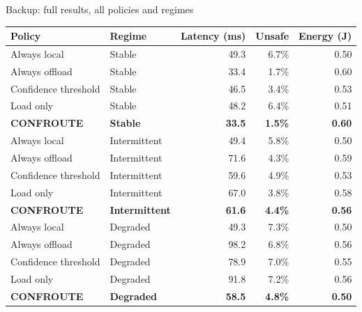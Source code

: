 \documentclass[aspectratio=169, 11pt]{beamer}
\newcommand{\hl}[1]{{\color{cblue}\bfseries #1}}
\begin{document}
\begin{frame}{Backup: full results, all policies and regimes}

\vspace{0.4em}
\centering
{\footnotesize
\begin{tabular}{@{}llrrr@{}}
\toprule
\textbf{\color{navy}Policy} & \textbf{\color{navy}Regime} & \textbf{\color{navy}Latency (ms)} & \textbf{\color{navy}Unsafe} & \textbf{\color{navy}Energy (J)} \\
\midrule
Always local        & Stable       & 49.3 & 6.7\% & 0.50 \\
Always offload      & Stable       & 33.4 & 1.7\% & 0.60 \\
Confidence threshold& Stable       & 46.5 & 3.4\% & 0.53 \\
Load only           & Stable       & 48.2 & 6.4\% & 0.51 \\
\hl{CONFROUTE} & \hl{Stable} & \hl{33.5} & \hl{1.5\%} & \hl{0.60} \\
\midrule
Always local        & Intermittent & 49.4 & 5.8\% & 0.50 \\
Always offload      & Intermittent & 71.6 & 4.3\% & 0.59 \\
Confidence threshold& Intermittent & 59.6 & 4.9\% & 0.53 \\
Load only           & Intermittent & 67.0 & 3.8\% & 0.58 \\
\hl{CONFROUTE} & \hl{Intermittent} & \hl{61.6} & \hl{4.4\%} & \hl{0.56} \\
\midrule
Always local        & Degraded     & 49.3 & 7.3\% & 0.50 \\
Always offload      & Degraded     & 98.2 & 6.8\% & 0.56 \\
Confidence threshold& Degraded     & 78.9 & 7.0\% & 0.55 \\
Load only           & Degraded     & 91.8 & 7.2\% & 0.56 \\
\hl{CONFROUTE} & \hl{Degraded} & \hl{58.5} & \hl{4.8\%} & \hl{0.50} \\
\bottomrule
\end{tabular}}
\end{frame}
\end{document}
